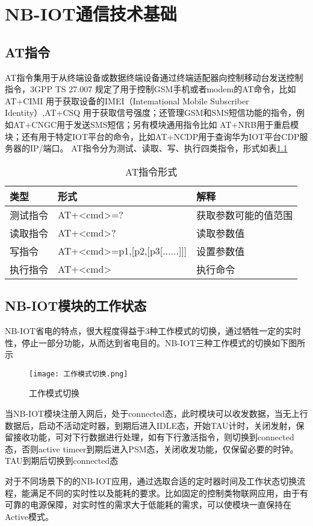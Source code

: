 \chapter{NB-IOT通信技术基础}


\section{AT指令}
AT指令集用于从终端设备或数据终端设备通过终端适配器向控制移动台发送控制指令，3GPP TS 27.007 规定了用于控制GSM手机或者modem的AT命令，比如 AT+CIMI 用于获取设备的IMEI（Intemational Mobile Subscriber Identity）,AT+CSQ 用于获取信号强度；还管理GSM和SMS短信功能的指令，例如AT+CNGC用于发送SMS短信；另有模块通用指令比如 AT+NRB用于重启模块；还有用于特定IOT平台的命令，比如AT+NCDP用于查询华为IOT平台CDP服务器的IP/端口。
AT指令分为测试、读取、写、执行四类指令，形式如表\ref{AT指令形式}

\begin{table}[h!]
\caption{AT指令形式}
\begin{tabular}{lll}
\toprule
类型&形式&解释\\
\midrule
测试指令&AT+<cmd>=?&获取参数可能的值范围\\
读取指令&AT+<cmd>?&读取参数值\\
写指令&AT+<cmd>=p1,[p2,[p3[......]]]&设置参数值\\
执行指令&AT+<cmd>&执行命令\\
\bottomrule
\end{tabular}
\label{AT指令形式}
\end{table}


\section{NB-IOT模块的工作状态}
NB-IOT省电的特点，很大程度得益于3种工作模式的切换，通过牺牲一定的实时性，停止一部分功能，从而达到省电目的。NB-IOT三种工作模式的切换如下图所示
\begin{figure}[h]
	\centering
	\texttt{[image: 工作模式切换.png]}
	\caption{工作模式切换}
	\label{工作模式切换}
\end{figure}

当NB-IOT模块注册入网后，处于connected态，此时模块可以收发数据，当无上行数据后，启动不活动定时器，到期后进入IDLE态，开始TAU计时，关闭发射，保留接收功能，可对下行数据进行处理，如有下行激活指令，则切换到connected态，否则active timeer到期后进入PSM态，关闭收发功能，仅保留必要的时钟。TAU到期后切换到connected态

对于不同场景下的的NB-IOT应用，通过选取合适的定时器时间及工作状态切换流程，能满足不同的实时性以及能耗的要求。比如固定的控制类物联网应用，由于有可靠的电源保障，对实时性的需求大于低能耗的需求，可以使模块一直保持在Active模式。
